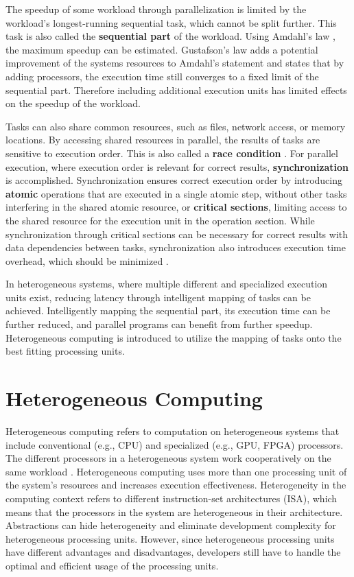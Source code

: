 The speedup of some workload through parallelization is limited by the workload's longest-running sequential task, which cannot be split further. This task is also called the \textbf{sequential part} of the workload. Using Amdahl's law \cite{amdahlValiditySingleProcessor1967}, the maximum speedup can be estimated. Gustafson's law \cite{gustafsonReevaluatingAmdahlLaw1988} adds a potential improvement of the systems resources to Amdahl's statement and states that by adding processors, the execution time still converges to a fixed limit of the sequential part. Therefore including additional execution units has limited effects on the speedup of the workload.

Tasks can also share common resources, such as files, network access, or memory locations. By accessing shared resources in parallel, the results of tasks are sensitive to execution order. This is also called a \textbf{race condition} \cite{dijkstraCooperatingSequentialProcesses2002}. For parallel execution, where execution order is relevant for correct results, \textbf{synchronization} is accomplished. Synchronization ensures correct execution order by introducing \textbf{atomic} operations that are executed in a single atomic step, without other tasks interfering in the shared atomic resource, or \textbf{critical sections}, limiting access to the shared resource for the execution unit in the operation section. While synchronization through critical sections can be necessary for correct results with data dependencies between tasks, synchronization also introduces execution time overhead, which should be minimized \cite{breshearsArtConcurrencyThread2009, shoshaniSequencingTasksMultiprocess1970}.

In heterogeneous systems, where multiple different and specialized execution units exist, reducing latency through intelligent mapping of tasks can be achieved. Intelligently mapping the sequential part, its execution time can be further reduced, and parallel programs can benefit from further speedup. Heterogeneous computing is introduced to utilize the mapping of tasks onto the best fitting processing units.

\section{Heterogeneous Computing}
Heterogeneous computing refers to computation on heterogeneous systems that include conventional (e.g., CPU) and specialized (e.g., GPU, FPGA) processors. The different processors in a heterogeneous system work cooperatively on the same workload \cite{shanHeterogeneousProcessingStrategy2006}. Heterogeneous computing uses more than one processing unit of the system's resources and increases execution effectiveness. Heterogeneity in the computing context refers to different instruction-set architectures (ISA), which means that the processors in the system are heterogeneous in their architecture.
Abstractions can hide heterogeneity and eliminate development complexity for heterogeneous processing units. However, since heterogeneous processing units have different advantages and disadvantages, developers still have to handle the optimal and efficient usage of the processing units.

